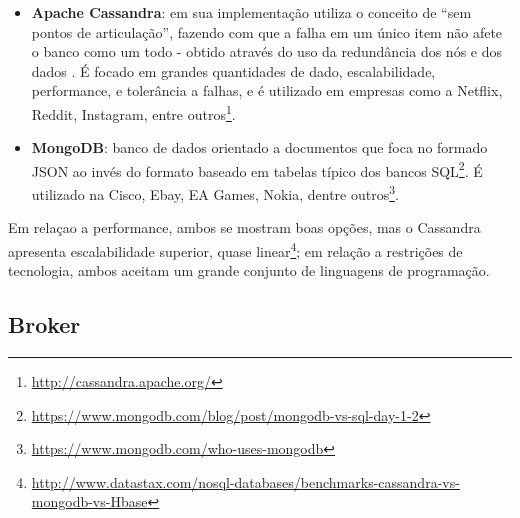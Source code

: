 \begin{itemize}
    \item \textbf{Apache Cassandra}: em sua implementação utiliza o conceito
        de ``sem pontos de articulação'', fazendo com que a falha em um único
        item não afete o banco como um todo - obtido através do uso da
        redundância dos nós e dos dados \cite{estrada2016}. É focado em grandes
        quantidades de dado, escalabilidade, performance, e tolerância a falhas,
        e é utilizado em empresas como a Netflix, Reddit, Instagram, entre
        outros\footnote{\url{http://cassandra.apache.org/}}.

    \item \textbf{MongoDB}: banco de dados orientado a documentos que foca no
        formado JSON ao invés do formato baseado em tabelas típico dos bancos
        SQL\footnote{\url{https://www.mongodb.com/blog/post/mongodb-vs-sql-day-1-2}}.
        É utilizado na Cisco, Ebay, EA Games, Nokia, dentre
        outros\footnote{\url{https://www.mongodb.com/who-uses-mongodb}}.
\end{itemize}

Em relaçao a performance, ambos se mostram boas opções, mas o Cassandra
apresenta escalabilidade superior, quase
linear\footnote{\url{http://www.datastax.com/nosql-databases/benchmarks-cassandra-vs-mongodb-vs-Hbase}};
em relação a restrições de tecnologia, ambos aceitam um grande conjunto de
linguagens de programação.

\subsection{Broker}

